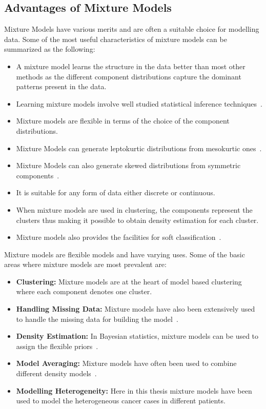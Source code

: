 \subsection*{Advantages of Mixture Models}
\label{ss:whymixmodels}
Mixture Models have various merits and are often a suitable choice for modelling data. Some of the most useful characteristics of mixture models can be summarized as the following:
\begin{itemize}
 \item A mixture model learns the structure in the data better than most other methods as the different component distributions capture the dominant patterns present in the data. 
 \item Learning mixture models involve well studied statistical inference techniques~\cite{mclachlanfmm}. 
 \item Mixture models are flexible in terms of the choice of the component distributions.
 \item Mixture Models can generate leptokurtic distributions from mesokurtic ones~\cite{pdeb}.
 \item Mixture Models can also generate skewed distributions from symmetric components~\cite{pdeb}.
 \item It is suitable for any form of data either discrete or continuous.
 \item When mixture models are used in clustering, the components represent the clusters thus making it possible to obtain density estimation for each cluster.
 \item Mixture models also provides the facilities for soft classification~\cite{pdeb}. 
\end{itemize}

Mixture models are flexible models and have varying uses. Some of the basic areas where mixture models are most prevalent are:
\begin{itemize}
 \item \textbf{Clustering:} Mixture models are at the heart of model based clustering where each component denotes one cluster.
 \item \textbf{Handling Missing Data:} Mixture models have also been extensively used to handle the missing data for building the model~\cite{mclachlanfmm}.
 \item \textbf{Density Estimation:} In Bayesian statistics, mixture models can be used to assign the flexible priors~\cite{mclachlanfmm}.
 \item \textbf{Model Averaging:} Mixture models have often been used to combine different density models~\cite{bishop}.
 \item \textbf{Modelling Heterogeneity:} Here in this thesis mixture models have been used to model the heterogeneous cancer cases in different patients.  
\end{itemize}

